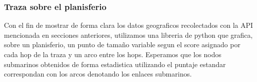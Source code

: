 \subsubsection{Traza sobre el planisferio}
Con el fin de mostrar de forma clara los datos geograficos recolectados con la API mencionada en secciones anteriores, utilizamos una libreria de python que grafica, sobre un planisferio, un punto de tamaño variable segun el score asignado por cada hop de la traza y un arco entre los hops. Esperamos que los nodos submarinos obtenidos de forma estadistica utilizando el puntaje estandar correspondan con los arcos denotando los enlaces submarinos.